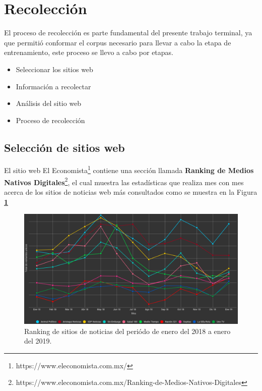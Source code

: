 \section{Recolección}


El proceso de recolección es parte fundamental del presente trabajo terminal, ya que permitió conformar el corpus necesario para llevar a cabo la etapa de entrenamiento, este proceso se llevo a cabo por etapas.

\begin{itemize}
	\item Seleccionar los sitios web
	\item Información a recolectar
	\item Análisis del sitio web
	\item Proceso de recolección
\end{itemize}

\subsection{Selección de sitios web}

El sitio web El Economista\footnote{https://www.eleconomista.com.mx/} contiene una sección llamada 
\textbf{Ranking de Medios Nativos Digitales}\footnote{https://www.eleconomista.com.mx/Ranking-de-Medios-Nativos-Digitales}, 
el cual muestra las estadísticas que realiza mes con mes acerca de los sitios de noticias web más consultados como se muestra en la Figura \textbf{\ref{fig:rank}}
\begin{figure}[H]
  \centering
  \includegraphics[scale=.28]{imagenes/Capitulo5/ranking.png}
  \caption{Ranking de sitios de noticias del periódo de enero del 2018 a enero del 2019.}
  \label{fig:rank}
\end{figure}

